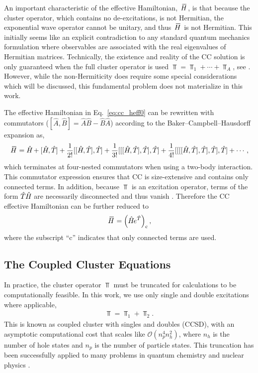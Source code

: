 \documentclass[thesis.tex]{subfiles}
\begin{document}
An important characteristic of the effective Hamiltonian, $\EHam$, is that because the cluster operator, which contains no de-excitations, is not Hermitian, the exponential wave operator cannot be unitary, and thus $\EHam$ is not Hermitian.  This initially seems like an explicit contradiction to any standard quantum mechanics formulation where observables are associated with the real eigenvalues of Hermitian matrices. Technically, the existence and reality of the CC solution is only guaranteed when the full cluster operator is used $\Top = \Top_{1} + \cdots + \Top_{A}$, see \cite{ZIVKOVIC1977,MOISEYEV2011}.  However, while the non-Hermiticity does require some special considerations which will be discussed, this fundamental problem does not materialize in this work.

The effective Hamiltonian in Eq.\ \eqref{eq:cc_heff0} can be rewritten with commutators ($[ \hat{A},\hat{B} ] = \hat{A}\hat{B} - \hat{B}\hat{A}$) according to the Baker--Campbell--Hausdorff expansion as,
\begin{align*}
  \EHam = \Ham + [\Ham, \Top] + \frac{1}{2!} [[\Ham, \Top], \Top] + \frac{1}{3!} [[[\Ham, \Top], \Top], \Top] + \frac{1}{4!} [[[[\Ham, \Top], \Top], \Top], \Top] + \cdots,
\end{align*}
which terminates at four-nested commutators when using a two-body  interaction.  This commutator expression ensures that CC is size-extensive and contains only connected terms.  In addition, because $\Top$ is an excitation operator, terms of the form $\hat{T}\hspace{-0.25pt}\hat{H}\hspace{-1pt}$ are necessarily disconnected and thus vanish \cite{SHAVITT2009}.  Therefore the CC effective Hamiltonian can be further reduced to
\begin{align} \label{eq:cc_heff1}
  \EHam = \left(\Ham e^{\hat{T}}\right)_{\mathrm{c}},
\end{align}
where the subscript ``$\mathrm{c}$'' indicates that only connected terms are used.

\subsection{The Coupled Cluster Equations} \label{section:intro_cc_equations}

In practice, the cluster operator $\Top$ must be truncated for calculations to be computationally feasible.  In this work, we use only single and double excitations where applicable,
\begin{align*}
  \Top = \Top_{1} + \Top_{2}.
\end{align*}
This is known as coupled cluster with singles and doubles (CCSD), with an asymptotic computational cost that scales like $\mathcal{O}\left( n_{p}^{4}n_{h}^{2} \right)$, where $n_{h}$ is the number of hole states and $n_{p}$ is the number of particle states.  This truncation has been successfully applied to many problems in quantum chemistry \cite{BARTLETT2007291} and nuclear physics \cite{KOWALSKI2004132501,HAGEN2014096302}.
\end{document}
